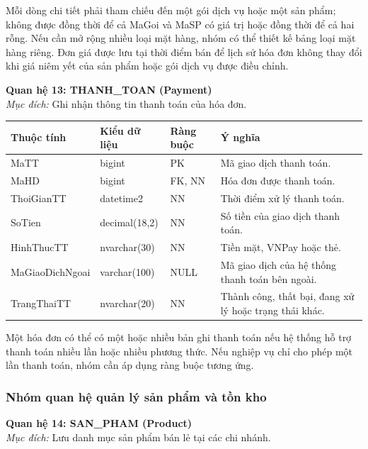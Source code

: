 \documentclass[11pt, a4paper]{article}
\begin{document}
Mỗi dòng chi tiết phải tham chiếu đến một gói dịch vụ hoặc một sản phẩm; không được đồng thời để cả MaGoi và MaSP có giá trị hoặc đồng thời để cả hai rỗng. Nếu cần mở rộng nhiều loại mặt hàng, nhóm có thể thiết kế bảng loại mặt hàng riêng. Đơn giá được lưu tại thời điểm bán để lịch sử hóa đơn không thay đổi khi giá niêm yết của sản phẩm hoặc gói dịch vụ được điều chỉnh.

\vspace{0.8em}
\textbf{Quan hệ 13: THANH\_TOAN (Payment)} \\
\textit{Mục đích:} Ghi nhận thông tin thanh toán của hóa đơn.

\begin{small}
\begin{tabularx}{\textwidth}{| C{3.2cm} | C{2.2cm} | C{2.2cm} | Y |}
\hline
\textbf{Thuộc tính} & \textbf{Kiểu dữ liệu} & \textbf{Ràng buộc} & \textbf{Ý nghĩa} \\
\hline
MaTT & bigint & PK & Mã giao dịch thanh toán. \\
\hline
MaHD & bigint & FK, NN & Hóa đơn được thanh toán. \\
\hline
ThoiGianTT & datetime2 & NN & Thời điểm xử lý thanh toán. \\
\hline
SoTien & decimal(18,2) & NN & Số tiền của giao dịch thanh toán. \\
\hline
HinhThucTT & nvarchar(30) & NN & Tiền mặt, VNPay hoặc thẻ. \\
\hline
MaGiaoDichNgoai & varchar(100) & NULL & Mã giao dịch của hệ thống thanh toán bên ngoài. \\
\hline
TrangThaiTT & nvarchar(20) & NN & Thành công, thất bại, đang xử lý hoặc trạng thái khác. \\
\hline
\end{tabularx}
\end{small}

Một hóa đơn có thể có một hoặc nhiều bản ghi thanh toán nếu hệ thống hỗ trợ thanh toán nhiều lần hoặc nhiều phương thức. Nếu nghiệp vụ chỉ cho phép một lần thanh toán, nhóm cần áp dụng ràng buộc tương ứng.

\subsubsection{Nhóm quan hệ quản lý sản phẩm và tồn kho}

\textbf{Quan hệ 14: SAN\_PHAM (Product)} \\
\textit{Mục đích:} Lưu danh mục sản phẩm bán lẻ tại các chi nhánh.
\end{document}
